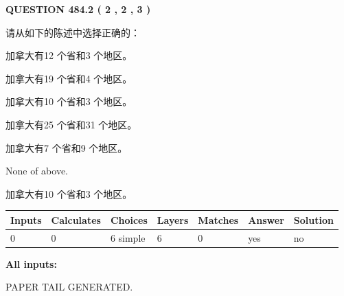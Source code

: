 \documentclass{ctexart}
\begin{document}
   
  
\vspace{0.2in}
  
{\textbf{\Large{QUESTION
484.2 
 ( 2 , 2 , 3 )
}}}
  
  
请从如下的陈述中选择正确的：
 
 
加拿大有12 个省和3 个地区。
 
 
加拿大有19 个省和4 个地区。
 
 
加拿大有10 个省和3 个地区。
 
 
加拿大有25 个省和31 个地区。
 
 
加拿大有7 个省和9 个地区。
 
 
 None of above.
 
 
\noindent{}
 
 
加拿大有10 个省和3 个地区。
 
 
\noindent{}
 
 
   
   
   
   
\noindent\begin{tabular}{|l|l|l|l|l|l|l|}
 \hline
Inputs & Calculates & Choices & Layers & Matches & Answer & Solution \\ \hline
 0  & 
 0  & 
 6
  simple  
  & 
 6  & 
 0  & 
  yes & 
  no 
  \\ \hline
 \end{tabular}
   
   
   
   
\noindent{}
   
   
   
   
\noindent\vspace{0.1in}\hspace{-0.08in} {\textbf{\Large{All inputs: }}}
   
   
   
   
   
   
 \vspace{0.2in}
 
   
   
\vspace{2.0in} PAPER TAIL GENERATED.
   
\end{document}
